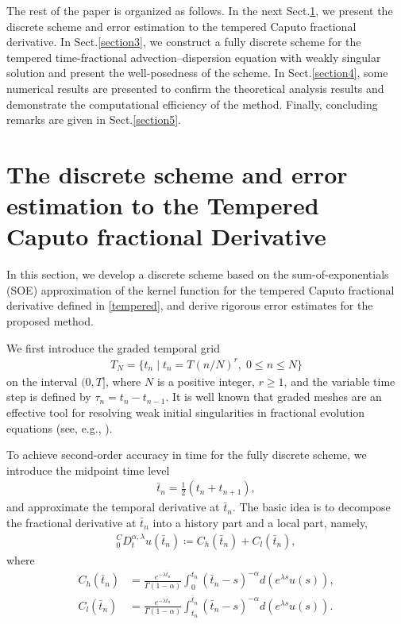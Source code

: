 \documentclass[10pt, reqno]{amsart}
\theoremstyle{remark}
\theoremstyle{definition}
\numberwithin{table}{section}
\begin{document}
The rest of the paper is organized as follows. In the next Sect.\ref{charpter2}, we present the discrete scheme and error estimation to the tempered Caputo fractional derivative. In Sect.\ref{section3}, we construct a fully discrete
scheme for the tempered time-fractional advection–dispersion equation with weakly singular solution and present the well-posedness of the scheme. In Sect.\ref{section4}, some numerical results are presented to confirm
the theoretical analysis results and demonstrate the computational efficiency of the method. Finally, concluding remarks are given in Sect.\ref{section5}.
\section{The discrete scheme and error estimation to the Tempered Caputo fractional Derivative }
\label{charpter2}
In this section, we develop a discrete scheme based on the sum-of-exponentials (SOE) approximation of the kernel function for the tempered Caputo fractional derivative defined in \eqref{tempered}, and derive rigorous error estimates for the proposed method.

We first introduce the graded temporal grid
\begin{align}
T_N = \{ t_n \mid t_n = T (n/N)^r, \; 0\le n \le N\} \label{graded}
\end{align}
on the interval $(0, T]$, where $N$ is a positive integer, $r \ge 1$, and the variable time step is defined by $\tau_n = t_n - t_{n-1}$. It is well known that graded meshes are an effective tool for resolving weak initial singularities in fractional evolution equations (see, e.g., \cite{Brunner1985,cao2020,Liao2018,safari2022}).

To achieve second-order accuracy in time for the fully discrete scheme, we introduce the midpoint time level
\begin{align}
    \bar{t}_n = \frac{1}{2}(t_n + t_{n+1}),
\end{align}
and approximate the temporal derivative at $\bar{t}_n$. The basic idea is to decompose the fractional derivative at $\bar{t}_n$ into a history part and a local part, namely,
\begin{align}
{ }_0^C D_t^{\alpha,  \lambda} u(\bar{t}_n)\coloneqq C_h(\bar{t}_n)+C_l(\bar{t}_n) , \label{fast_define}
\end{align}
where
\begin{align}
    C_h(\bar{t}_n)&=\frac{e^{-\lambda \bar{t}_n}}{\Gamma(1-\alpha)}\int_0^{t_{n}} (\bar{t}_n-s)^{-\alpha} d(e^{\lambda s} u(s)),\label{history}\\
    C_l(\bar{t}_n)&=\frac{e^{-\lambda \bar{t}_n}}{\Gamma(1-\alpha)}\int_{t_{n}}^{\bar{t}_n} (\bar{t}_n-s)^{-\alpha} d(e^{\lambda s} u(s)).\label{local}
\end{align}
\end{document}
